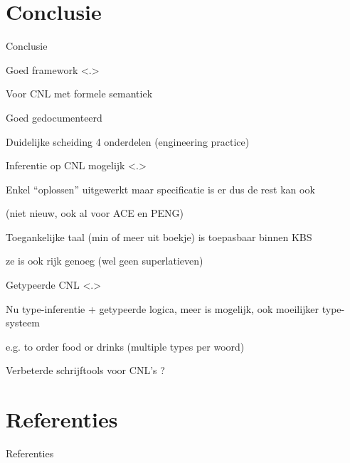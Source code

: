 \documentclass[notes, dvipsnames]{beamer}
\newcommand{\hitem}{
	\ppause
	\item
}
\newcommand{\ppause}{\onslide<+>}
\newcommand{\nnote}[1]{\note<.>{#1}}
\begin{document}
  \section{Conclusie}
  \begin{frame}{Conclusie}
    \begin{itemize}
      \hitem Goed framework
      \nnote{
        Voor CNL met formele semantiek
        \item Goed gedocumenteerd
        \item Duidelijke scheiding 4 onderdelen (engineering practice)
      }
      \hitem Inferentie op CNL mogelijk
      \nnote{
        \item Enkel ``oplossen'' uitgewerkt maar specificatie is er dus de rest kan ook
        \item (niet nieuw, ook al voor ACE en PENG)
        \item Toegankelijke taal (min of meer uit boekje) is toepasbaar binnen KBS
        \item ze is ook rijk genoeg (wel geen superlatieven)
      }
      \hitem Getypeerde CNL
      \nnote{
        \item Nu type-inferentie + getypeerde logica, meer is mogelijk, ook moeilijker type-systeem
        \item e.g. to order food or drinks (multiple types per woord)
        \item Verbeterde schrijftools voor CNL's ?
      }
    \end{itemize}
  \end{frame}

			
	\section{Referenties}
	\begin{frame}[allowframebreaks]{Referenties}
		
		
	\end{frame}
	
\end{document}
